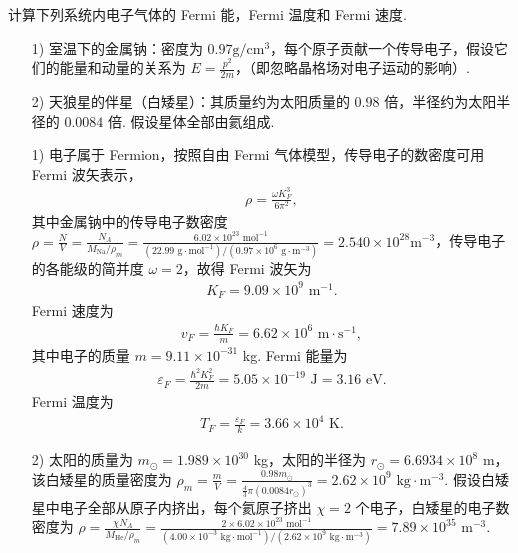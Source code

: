 \documentclass{assignment}
\begin{document}
\begin{prob}
    计算下列系统内电子气体的 Fermi 能，Fermi 温度和 Fermi 速度.
    \begin{itemize}
        \item[1)] 室温下的金属钠：密度为 $0.97\mathrm{g}/\mathrm{cm}^3$，每个原子贡献一个传导电子，假设它们的能量和动量的关系为 $E=\frac{p^2}{2m}$，（即忽略晶格场对电子运动的影响）.
        \item[2)] 天狼星的伴星（白矮星）：其质量约为太阳质量的 $0.98$ 倍，半径约为太阳半径的 $0.0084$ 倍. 假设星体全部由氦组成.
    \end{itemize}
\end{prob}
\begin{sol}
    \begin{itemize}
        \item[1)] 电子属于 Fermion，按照自由 Fermi 气体模型，传导电子的数密度可用 Fermi 波矢表示，
        \begin{align}
            \rho=\frac{\omega K_F^3}{6\pi^2},
        \end{align}
        其中金属钠中的传导电子数密度 $\rho=\frac{N}{V}=\frac{N_A}{M_{\text{Na}}/\rho_m}=\frac{6.02\times 10^{23}\text{ mol}^{-1}}{(22.99\text{ g}\cdot\text{mol}^{-1})/(0.97\times 10^6\text{ g}\cdot\text{m}^{-3})}=2.540\times 10^{28}\text{m}^{-3}$，传导电子的各能级的简并度 $\omega=2$，故得 Fermi 波矢为
        \begin{align}
            K_F=9.09\times 10^9\text{ m}^{-1}.
        \end{align}
        Fermi 速度为
        \begin{align}
            v_F=\frac{\hbar K_F}{m}=6.62\times 10^6\text{ m}\cdot\text{s}^{-1},
        \end{align}
        其中电子的质量 $m=9.11\times 10^{-31}$ kg. Fermi 能量为
        \begin{align}
            \varepsilon_F=\frac{\hbar^2K_F^2}{2m}=5.05\times 10^{-19}\text{ J}=3.16\text{ eV}.
        \end{align}
        Fermi 温度为
        \begin{align}
            T_F=\frac{\varepsilon_F}{k}=3.66\times 10^4\text{ K}.
        \end{align}
        \item[2)] 太阳的质量为 $m_{\odot}=1.989\times 10^{30}$ kg，太阳的半径为 $r_{\odot}=6.6934\times 10^8$ m，该白矮星的质量密度为 $\rho_m=\frac{m}{V}=\frac{0.98m_{\odot}}{\frac{4}{3}\pi(0.0084r_{\odot})^3}=2.62\times 10^9\text{ kg}\cdot\text{m}^{-3}$. 假设白矮星中电子全部从原子内挤出，每个氦原子挤出 $\chi=2$ 个电子，白矮星的电子数密度为 $\rho=\frac{\chi N_A}{M_{\text{He}}/\rho_m}=\frac{2\times 6.02\times 10^{23}\text{ mol}^{-1}}{(4.00\times 10^{-3}\text{ kg}\cdot\text{mol}^{-1})/(2.62\times 10^9\text{ kg}\cdot\text{m}^{-3})}=7.89\times 10^{35}\text{ m}^{-3}$.

\end{itemize}
\end{sol}
\end{document}
